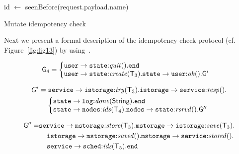 \begin{algorithm}[H]
	
	\SetAlgoLined
	id $\leftarrow$ seenBefore(request.payload.name)\\
	\caption{Mutate idempotency check}
	\label{alg:alg6}
\end{algorithm}

Next we present a formal description of the idempotency check protocol (cf. Figure~\ref{fig:fig13}) by using~\cite{HuY17}.

\begin{align*}
\G_4 & = 
\left\{
\begin{array}{@{}l@{}}  
\mathtt{user}\to\mathtt{state}{:} \mathit{quit}().\tend\\
\mathtt{user} \to \mathtt{state}{:}\mathit{create}(\T_3).
\mathtt{state} \to \mathtt{user}{:}\mathit{ok}().\G'
\end{array} \right.
\end{align*}

\begin{align*}
G' & = 
\mathtt{service} \to \mathtt{istorage}{:}\mathit{try}(\T_3).
\mathtt{istorage} \to \mathtt{service}{:}\mathit{resp}().\\
& \hspace{4mm}
\left\{
\begin{array}{@{}l@{}}
	\mathtt{state}\to\mathtt{log}{:} \mathit{done}(\mathsf{String}).\tend\\
	\mathtt{state}\to\mathtt{nodes}{:}\mathit{ids}(\T_4).
	\mathtt{nodes}\to \mathtt{state}{:}\mathit{rsrvd}().\G''
\end{array} \right.
\end{align*}

\begin{align*}
{\sf G}'' = & 
\mathtt{service} \to \mathtt{mstorage}{:}\mathit{store}({\mathsf T}_3).
\mathtt{mstorage} \to \mathtt{istorage}{:}\mathit{save}({\mathsf T}_3).\\
& \hspace{4mm}
\mathtt{istorage} \to \mathtt{mstorage}{:}\mathit{saved}().
\mathtt{mstorage} \to \mathtt{service}{:}\mathit{stored}().\\
& \hspace{4mm}
\mathtt{service} \to \mathtt{sched}{:}\mathit{ids}({\mathsf T}_5).\mathtt{end}
\end{align*}
%
%
